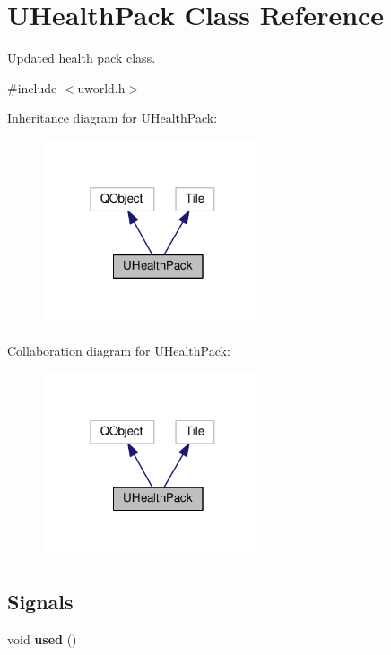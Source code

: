 \hypertarget{classUHealthPack}{}\section{U\+Health\+Pack Class Reference}
\label{classUHealthPack}


Updated health pack class.  




{\ttfamily \#include $<$uworld.\+h$>$}



Inheritance diagram for U\+Health\+Pack\+:
\nopagebreak
\begin{figure}[H]
\begin{center}
\leavevmode
\includegraphics[width=184pt]{d5/dd8/classUHealthPack__inherit__graph}
\end{center}
\end{figure}


Collaboration diagram for U\+Health\+Pack\+:
\nopagebreak
\begin{figure}[H]
\begin{center}
\leavevmode
\includegraphics[width=184pt]{df/da1/classUHealthPack__coll__graph}
\end{center}
\end{figure}
\subsection*{Signals}
\begin{DoxyCompactItemize}
\item 
void {\bfseries used} ()\hypertarget{classUHealthPack_a1f5645d92da31de8300ad6885875cf92}{}\label{classUHealthPack_a1f5645d92da31de8300ad6885875cf92}

\end{DoxyCompactItemize}

